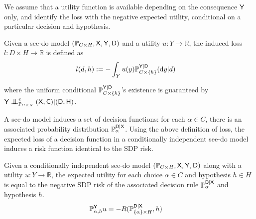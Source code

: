 We assume that a utility function is available depending on the consequence $\mathsf{Y}$ only, and identify the loss with the negative expected utility, conditional on a particular decision and hypothesis.
\begin{definition}
Given a see-do model $(\mathbb{P}_{C\times H}, \mathsf{X},\mathsf{Y},\mathsf{D})$ and a utility $u:Y\to \mathbb{R}$, the induced loss $l:D\times H\to \mathbb{R}$ is defined as
\begin{align}
    l(d,h)&:= -\int_Y u(y) \mathbb{P}_{C\times\{h\}}^{\mathsf{Y}|\mathsf{D}}(\mathrm{d}y|d)
\end{align}
\end{definition}
where the uniform conditional $\mathbb{P}_{C\times\{h\}}^{\mathsf{Y}|\mathsf{D}}$'s existence is guaranteed by $\RV{Y}\CI^e_{\prob{P}_{C\times H}} (\RV{X,C})|(\RV{D},\RV{H})$.

A see-do model induces a set of decision functions: for each $\alpha\in C$, there is an associated probability distribution $\mathbb{P}_\alpha^{\mathsf{D}|\mathsf{X}}$. Using the above definition of loss, the expected loss of a decision function in a conditionally independent see-do model induces a risk function identical to the SDP risk.
\begin{theorem}\label{th:ind_risk}
Given a conditionally independent see-do model $(\mathbb{P}_{C\times H}, \mathsf{X},\mathsf{Y},\mathsf{D})$ along with a utility $u:Y\to \mathbb{R}$, the expected utility for each choice $\alpha\in C$ and hypothesis $h\in H$ is equal to the negative SDP risk of the associated decision rule $\mathbb{P}_\alpha^{\mathsf{D}|\mathsf{X}}$ and hypothesis $h$.
\begin{align}
    \mathbb{P}_{\alpha,h}^{\mathsf{Y}}u &= -R(\mathbb{P}_{\{\alpha\}\times H}^{\mathsf{D}|\mathsf{X}},h)
\end{align}
\end{theorem}

